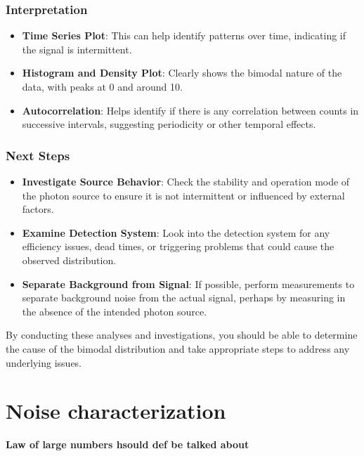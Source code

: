 \hypertarget{interpretation}{%
\subsubsection{Interpretation}\label{interpretation}}

\begin{itemize}
\tightlist
\item
  \textbf{Time Series Plot}: This can help identify patterns over time,
  indicating if the signal is intermittent.
\item
  \textbf{Histogram and Density Plot}: Clearly shows the bimodal nature
  of the data, with peaks at 0 and around 10.
\item
  \textbf{Autocorrelation}: Helps identify if there is any correlation
  between counts in successive intervals, suggesting periodicity or
  other temporal effects.
\end{itemize}

\hypertarget{next-steps}{%
\subsubsection{Next Steps}\label{next-steps}}

\begin{itemize}
\tightlist
\item
  \textbf{Investigate Source Behavior}: Check the stability and
  operation mode of the photon source to ensure it is not intermittent
  or influenced by external factors.
\item
  \textbf{Examine Detection System}: Look into the detection system for
  any efficiency issues, dead times, or triggering problems that could
  cause the observed distribution.
\item
  \textbf{Separate Background from Signal}: If possible, perform
  measurements to separate background noise from the actual signal,
  perhaps by measuring in the absence of the intended photon source.
\end{itemize}

By conducting these analyses and investigations, you should be able to
determine the cause of the bimodal distribution and take appropriate
steps to address any underlying issues.

\section{Noise characterization}
\textbf{Law of large numbers hsould def be talked about}

